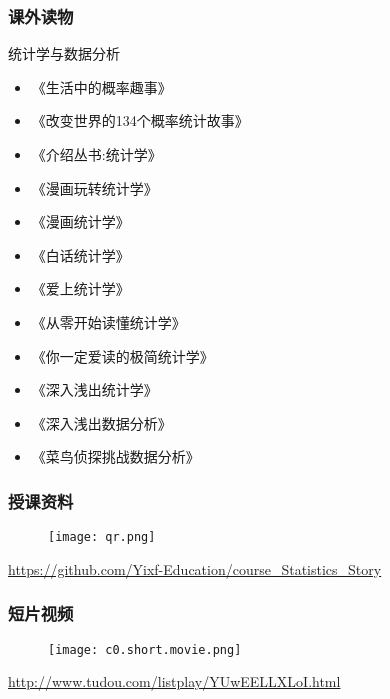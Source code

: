 \begin{frame}
  \frametitle{课外读物}
    \begin{block}{统计学与数据分析}
      \begin{multicols}{2}
      \begin{itemize}
         \item 《生活中的概率趣事》
         \item 《改变世界的134个概率统计故事》
         \item 《介绍丛书:统计学》
         \item 《漫画玩转统计学》
         \item 《漫画统计学》
         \item 《白话统计学》
         \item 《爱上统计学》
         \item 《从零开始读懂统计学》
         \item 《你一定爱读的极简统计学》
         \item 《深入浅出统计学》
         \item 《深入浅出数据分析》
         \item 《菜鸟侦探挑战数据分析》
        \end{itemize}
      \end{multicols}
    \end{block}
\end{frame}

\begin{frame}
  \frametitle{授课资料}
  \begin{figure}
    \centering
    \texttt{[image: qr.png]}
  \end{figure}
  \begin{center}
    \href{https://github.com/Yixf-Education/course_Statistics_Story}{https://github.com/Yixf-Education/course\_Statistics\_Story}
  \end{center}
\end{frame}

\begin{frame}
  \frametitle{短片视频}
  \begin{figure}
    \centering
    \texttt{[image: c0.short.movie.png]}
  \end{figure}
  \begin{center}
    \href{http://www.tudou.com/listplay/YUwEELLXLoI.html}{http://www.tudou.com/listplay/YUwEELLXLoI.html}
  \end{center}
\end{frame}

